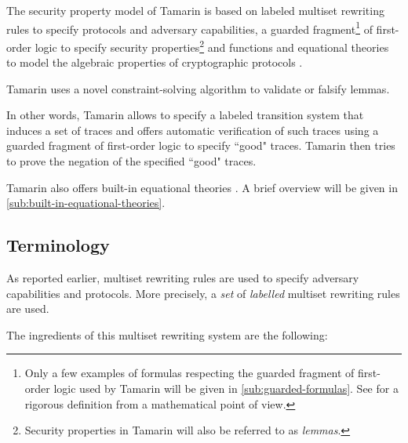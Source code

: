 The security property model of Tamarin is based on labeled multiset rewriting rules to specify protocols and adversary capabilities, a guarded fragment\footnote{Only a few examples of formulas respecting the guarded fragment of first-order logic used by Tamarin will be given in \cref{sub:guarded-formulas}. See \cite{FragmentFirstOrderLogicPaper} for a rigorous definition from a mathematical point of view.} of first-order logic to specify security properties\footnote{Security properties in Tamarin will also be referred to as \textit{lemmas}.} and functions and equational theories to model the algebraic properties of cryptographic protocols \cite{TamarinFoundations}.

Tamarin uses a novel constraint-solving algorithm to validate or falsify lemmas.

In other words, Tamarin allows to specify a labeled transition system that induces a set of traces and offers automatic verification of such traces using a guarded fragment of first-order logic to specify ``good" traces. Tamarin then tries to prove the negation of the specified ``good" traces.

Tamarin also offers built-in equational theories \cite{TamarinProverManual}. A brief overview will be given in \cref{sub:built-in-equational-theories}.

\subsection{Terminology}
\label{subsec:tamarin-foundations-terminology}
As reported earlier, multiset rewriting rules are used to specify adversary capabilities and protocols. More precisely, a \textit{set} of \textit{labelled} multiset rewriting rules are used.

The ingredients of this multiset rewriting system are the following:

